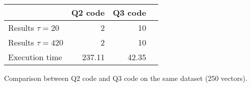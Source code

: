 \begin{tabular}{l r r c}
    \toprule
    {} & \textbf{Q2 code} & \textbf{Q3 code} \\
    \midrule
    Results $\tau = 20$ & 2
    & 10  \\
    Results $\tau = 420$ & 2%
    & 10  \\
    \midrule
    Execution time & 237.11 & 42.35&  \\
    \bottomrule
\end{tabular}
\makeatletter{}\makeatother%
\caption{Comparison between Q2 code and Q3 code on the same dataset (250 vectors).}
\label{tab:q2-vs-q3}